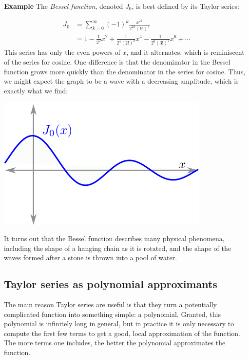 \documentclass[twoside,openright,titlepage,a4paper]{book}
\begin{document}
\begin{sloppypar}
\textbf{Example} The \textit{Bessel function}, denoted $J_0$, is best defined by its Taylor series:
\begin{examplebox}
\begin{align*} 
J_0 &= \sum_{k=0}^\infty (-1)^k \frac{x^{2k}}{2^{2k} (k!)^2} \\
&= 1 - \frac{1}{2^2} x^2 + \frac{1}{2^4(2!)^2}x^4 - \frac{1}{2^6 (3!)^2}x^6 + \dotsb 
\end{align*}
This series has only the even powers of $x$, and it alternates, which is reminiscent of the series for cosine. One difference is that the denominator in the Bessel function grows more quickly than the denominator in the series for cosine. Thus, we might expect the graph to be a wave with a decreasing amplitude, which is exactly what we find:
\begin{center}
	\includegraphics[scale=0.6]{Bessel}
\end{center}
It turns out that the Bessel function describes many physical phenomena, including the shape of a hanging chain as it is rotated, and the shape of the waves formed after a stone is thrown into a pool of water.
\end{examplebox}

\subsection{Taylor series as polynomial approximants}
The main reason Taylor series are useful is that they turn a potentially complicated function into something simple: a polynomial. Granted, this polynomial is infinitely long in general, but in practice it is only necessary to compute the first few terms to get a good, local approximation of the function. The more terms one includes, the better the polynomial approximates the function.


\end{sloppypar}
\end{document}
